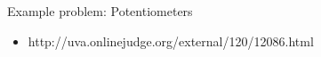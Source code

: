 \documentclass[12pt,t]{beamer}
\newcommand{\bi}{\begin{itemize}}
\newcommand{\ei}{\end{itemize}}
\begin{document}
\begin{frame}{Example problem: Potentiometers}
    \bi
        \item http://uva.onlinejudge.org/external/120/12086.html
    \ei
\end{frame}


\end{document}
